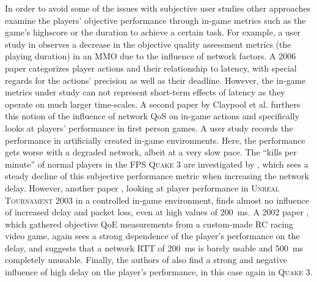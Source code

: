 In order to avoid some of the issues with subjective user studies other approaches examine the players' objective performance through in-game metrics such as the game's highscore or the duration to achieve a certain task. For example, a user study in \cite{Chen:2006:SOG:1167838.1167859} observes a decrease in the objective quality assessment metrics (the playing duration) in an \gls{MMO} due to the influence of network factors. A 2006 paper \cite{Claypool:2006:LPA:1167838.1167860} categorizes player actions and their relationship to latency, with special regards for the actions' precision as well as their deadline. However, the in-game metrics under study can not represent short-term effects of latency as they operate on much larger time-scales. 
A second paper by Claypool et al. \cite{claypool2007} furthers this notion of the influence of network \gls{QoS} on in-game actions and specifically looks at players' performance in first person games. A user study records the performance in artificially created in-game environments. Here, the performance gets worse with a degraded network, albeit at a very slow pace. %
The ``kills per minute'' of normal players in the \gls{FPS} \textsc{Quake 3} are investigated by \cite{1266180}, which sees a steady decline of this subjective performance metric when increasing the network delay. However, another paper \cite{Beigbeder:2004:ELL:1016540.1016556}, looking at player performance in \textsc{Unreal Tournament 2003} in a controlled in-game environment, finds almost no influence of increased delay and packet loss, even at high values of \SI{200}{\milli\second}. %
A 2002 paper \cite{Pantel:2002:IDR:507670.507674}, which gathered objective \gls{QoE} measurements from a custom-made RC racing video game, again sees a strong dependence of the player's performance on the delay, and suggests that a network \acrshort{RTT} of \SI{200}{\milli\second} is barely usable and \SI{500}{\milli\second} completely unusable. Finally, the authors of \cite{Bredel:2010:MSR:1944796.1944797} also find a strong and negative influence of high delay on the player's performance, in this case again in \textsc{Quake 3}. 

